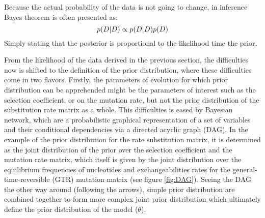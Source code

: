 Because the actual probability of the data is not going to change, in inference Bayes theorem is often presented as:
\begin{equation}
p(D|D) \propto p(D|D)p(D)
\end{equation}
Simply stating that the \gls{posterior} is proportional to the \gls{likelihood} time the \gls{prior}.

From the likelihood of the data derived in the previous section, the difficulties now is shifted to the definition of the prior distribution, where these difficulties come in two flavors.
Firstly, the parameters of evolution for which prior distribution can be apprehended might be the parameters of interest such as the selection coefficient, or on the mutation rate, but not the prior distribution of the substitution rate matrix as a whole.
This difficulties is eased by Bayesian network, which are a probabilistic graphical representation of a set of variables and their conditional dependencies via a directed acyclic graph (DAG).
In the example of the prior distribution for the rate substitution matrix, it is determined as the joint distribution of the prior over the selection coefficient and the mutation rate matrix, which itself is given by the joint distribution over the equilibrium frequencies of nucleotides and exchangeabilities rates for the general-time-reversible (GTR) mutation matrix (see figure \ref{fig:DAG}).
Seeing the DAG the other way around (following the arrows), simple prior distribution are combined together to form more complex joint prior distribution which ultimately define the prior distribution of the model ($\theta$).


